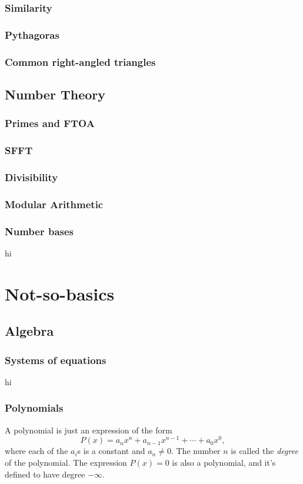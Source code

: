 \documentclass{amsart}
\begin{document}
\subsubsection{Similarity}
\subsubsection{Pythagoras}
\subsubsection{Common right-angled triangles}
\subsection{Number Theory}
\subsubsection{Primes and FTOA}
\subsubsection{SFFT}
\subsubsection{Divisibility}
\subsubsection{Modular Arithmetic}
\subsubsection{Number bases}\label{b:n:bases}
hi
\section{Not-so-basics}
\subsection{Algebra}
\subsubsection{Systems of equations}\label{n:a:systems}
hi
\subsubsection{Polynomials}
A polynomial is just an expression of the form
\[P(x)=a_n x^n+a_{n-1}x^{n-1}+\cdots+a_0x^0,\] where each of the $a_i$s is a
constant and $a_n\ne 0$.
The number $n$ is called the \emph{degree} of the polynomial. The expression
$P(x)=0$ is also a polynomial, and it's defined to have degree $-\infty$.
\end{document}
